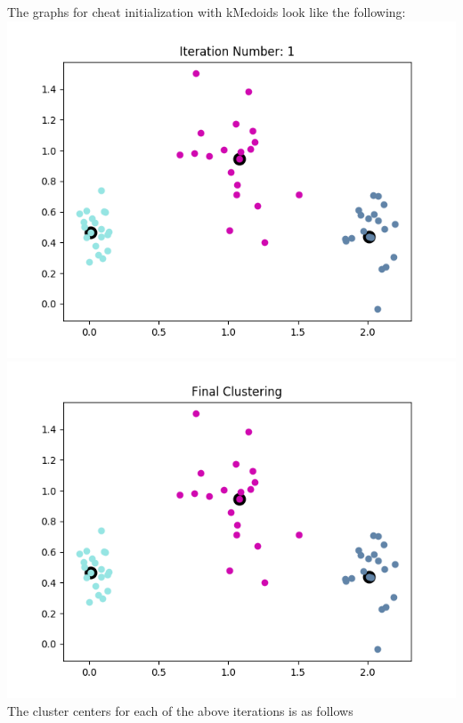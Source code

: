 \documentclass[11pt]{article}
\begin{document}
\begin{enumerate}
The graphs for cheat initialization with kMedoids look like the following: \newline
\includegraphics[scale=0.4]{medoids_cheat_1.png}
\includegraphics[scale=0.4]{medoids_cheat_final.png} \newline
The cluster centers for each of the above iterations is as follows
\begin{center}
\end{center}		
\end{enumerate}
\end{document}
